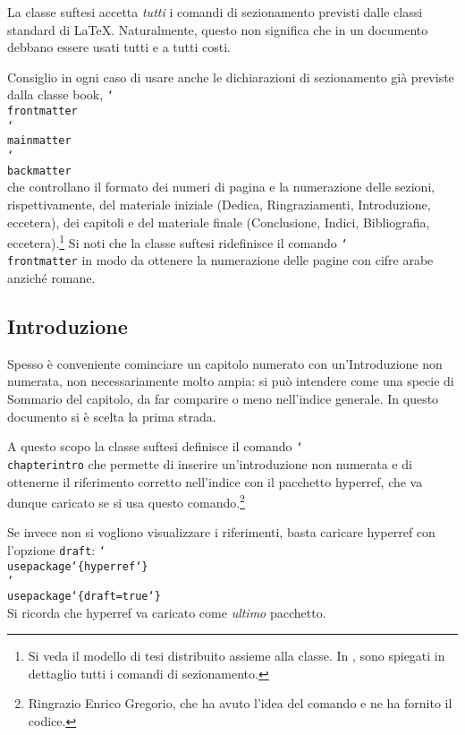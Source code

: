 \documentclass{suftesi}
\DeclareRobustCommand*{\cs}[1]{\texttt{\char`\\#1}}
\DeclareRobustCommand*{\ar}[1]{\texttt{\char`\{#1\char`\}}}
\newcommand*{\option}{\texttt}
\newcommand{\pack}{\textsf}
\newcommand{\class}{\textsf}
\def\suftesi{\textsf{suftesi}}
\newenvironment{ttquote}
  {\genquote[\ttfamily\microtypesetup{activate=false}]}
  {\endgenquote}
\begin{document}
La classe \suftesi{} accetta \emph{tutti} i comandi di
sezionamento previsti dalle classi standard di \LaTeX. Naturalmente,
questo non significa che in un documento debbano essere usati tutti e
a tutti costi.

Consiglio in ogni caso di usare anche le dichiarazioni di sezionamento già previste dalla classe \class{book},
\begin{ttquote}
\cs{frontmatter}\\
\cs{mainmatter}\\
\cs{backmatter}\\
\end{ttquote}
che controllano il formato dei numeri di pagina e la numerazione delle sezioni, rispettivamente, del materiale iniziale (Dedica, Ringraziamenti, Introduzione, eccetera), dei capitoli e del materiale finale (Conclusione, Indici, Bibliografia, eccetera).\footnote{Si veda il modello di tesi distribuito assieme alla classe. In \cite[sez.~4.4]{Pantieri:2010}, sono spiegati in dettaglio tutti i comandi di sezionamento.} Si noti che la classe \suftesi{} ridefinisce il comando \cs{frontmatter} in modo da ottenere la numerazione delle pagine con cifre arabe anziché romane.

\subsection{Introduzione}

Spesso è conveniente cominciare un capitolo numerato con un'Introduzione non numerata, non necessariamente molto ampia: si può intendere come una specie di Sommario del capitolo, da far comparire o meno nell'indice generale. In questo documento si è scelta la prima strada.

A questo scopo la classe \suftesi{} definisce il comando
\begin{ttquote}
\cs{chapterintro}
\end{ttquote}
che permette di inserire un'introduzione non numerata e di ottenerne il riferimento corretto nell'indice con il pacchetto \pack{hyperref}, che va dunque caricato se si usa questo comando.\footnote{Ringrazio Enrico Gregorio, che ha avuto l'idea del comando e ne ha fornito il codice.} 

Se invece non si vogliono visualizzare i riferimenti, basta caricare \pack{hyperref} con l'opzione \option{draft}:
\begin{ttquote}
\cs{usepackage}\ar{hyperref}\\
\cs{usepackage}\ar{draft=true}\\
\end{ttquote}
Si ricorda che \pack{hyperref} va caricato come \emph{ultimo} pacchetto.
\end{document}
